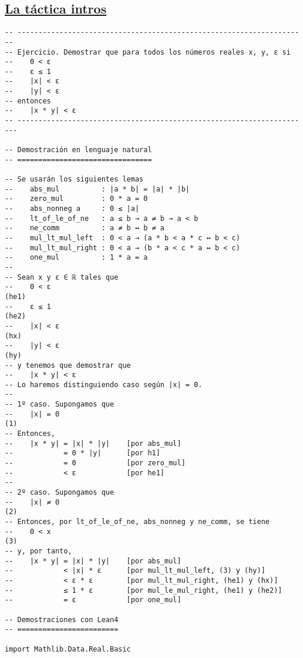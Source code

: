 \subsection{\href{./src/Logica/La\_tactica\_intros.lean}{La táctica intros}}
\label{sec:orgefee739}
\begin{verbatim}
-- ---------------------------------------------------------------------
-- Ejercicio. Demostrar que para todos los números reales x, y, ε si
--    0 < ε
--    ε ≤ 1
--    |x| < ε
--    |y| < ε
-- entonces
--    |x * y| < ε
-- ----------------------------------------------------------------------

-- Demostración en lenguaje natural
-- ================================

-- Se usarán los siguientes lemas
--    abs_mul          : |a * b| = |a| * |b|
--    zero_mul         : 0 * a = 0
--    abs_nonneg a     : 0 ≤ |a|
--    lt_of_le_of_ne   : a ≤ b → a ≠ b → a < b
--    ne_comm          : a ≠ b ↔ b ≠ a
--    mul_lt_mul_left  : 0 < a → (a * b < a * c ↔ b < c)
--    mul_lt_mul_right : 0 < a → (b * a < c * a ↔ b < c)
--    one_mul          : 1 * a = a
--
-- Sean x y ε ∈ ℝ tales que
--    0 < ε                                                         (he1)
--    ε ≤ 1                                                         (he2)
--    |x| < ε                                                       (hx)
--    |y| < ε                                                       (hy)
-- y tenemos que demostrar que
--    |x * y| < ε
-- Lo haremos distinguiendo caso según |x| = 0.
--
-- 1º caso. Supongamos que
--    |x| = 0                                                        (1)
-- Entonces,
--    |x * y| = |x| * |y|    [por abs_mul]
--            = 0 * |y|      [por h1]
--            = 0            [por zero_mul]
--            < ε            [por he1]
--
-- 2º caso. Supongamos que
--    |x| ≠ 0                                                        (2)
-- Entonces, por lt_of_le_of_ne, abs_nonneg y ne_comm, se tiene
--    0 < x                                                          (3)
-- y, por tanto,
--    |x * y| = |x| * |y|    [por abs_mul]
--            < |x| * ε      [por mul_lt_mul_left, (3) y (hy)]
--            < ε * ε        [por mul_lt_mul_right, (he1) y (hx)]
--            ≤ 1 * ε        [por mul_le_mul_right, (he1) y (he2)]
--            = ε            [por one_mul]

-- Demostraciones con Lean4
-- ========================

import Mathlib.Data.Real.Basic


\end{verbatim}

